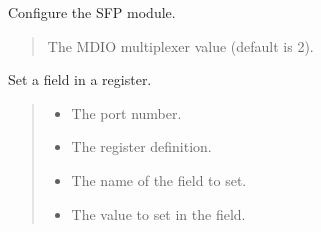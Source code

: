 \documentclass[letterpaper,10pt,english]{sphinxmanual}
\begin{document}

\begin{fulllineitems}
\label{\detokenize{cplddocs:phy_marvell_88X2222_init.set_SFP}}
\pysigstartsignatures
{}
\pysigstopsignatures
\sphinxAtStartPar
Configure the SFP module.
\begin{quote}\begin{description}
\sphinxAtStartPar
{} \textendash{} The MDIO multiplexer value (default is 2).

\end{description}\end{quote}

\end{fulllineitems}


\begin{fulllineitems}
\label{\detokenize{cplddocs:phy_marvell_88X2222_init.set_field}}
\pysigstartsignatures
{}
\pysigstopsignatures
\sphinxAtStartPar
Set a field in a register.
\begin{quote}\begin{description}
\begin{itemize}
\item {} 
\sphinxAtStartPar
{} \textendash{} The port number.

\item {} 
\sphinxAtStartPar
{} \textendash{} The register definition.

\item {} 
\sphinxAtStartPar
{} \textendash{} The name of the field to set.

\item {} 
\sphinxAtStartPar
{} \textendash{} The value to set in the field.

\end{itemize}

\end{description}\end{quote}

\end{fulllineitems}
\end{document}
